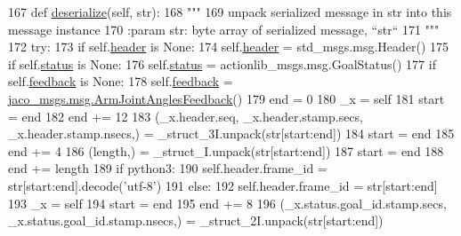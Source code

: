 \begin{DoxyCode}
167   \textcolor{keyword}{def }\hyperlink{classjaco__msgs_1_1msg_1_1__ArmJointAnglesActionFeedback_1_1ArmJointAnglesActionFeedback_afc2ada714b8f020c3588b9e5ad89b929}{deserialize}(self, str):
168     \textcolor{stringliteral}{"""}
169 \textcolor{stringliteral}{    unpack serialized message in str into this message instance}
170 \textcolor{stringliteral}{    :param str: byte array of serialized message, ``str``}
171 \textcolor{stringliteral}{    """}
172     \textcolor{keywordflow}{try}:
173       \textcolor{keywordflow}{if} self.\hyperlink{classjaco__msgs_1_1msg_1_1__ArmJointAnglesActionFeedback_1_1ArmJointAnglesActionFeedback_a7b1ea60184ef4d13c068de04538e8b50}{header} \textcolor{keywordflow}{is} \textcolor{keywordtype}{None}:
174         self.\hyperlink{classjaco__msgs_1_1msg_1_1__ArmJointAnglesActionFeedback_1_1ArmJointAnglesActionFeedback_a7b1ea60184ef4d13c068de04538e8b50}{header} = std\_msgs.msg.Header()
175       \textcolor{keywordflow}{if} self.\hyperlink{classjaco__msgs_1_1msg_1_1__ArmJointAnglesActionFeedback_1_1ArmJointAnglesActionFeedback_a8f64e8403349abcd0a905118e41ba76d}{status} \textcolor{keywordflow}{is} \textcolor{keywordtype}{None}:
176         self.\hyperlink{classjaco__msgs_1_1msg_1_1__ArmJointAnglesActionFeedback_1_1ArmJointAnglesActionFeedback_a8f64e8403349abcd0a905118e41ba76d}{status} = actionlib\_msgs.msg.GoalStatus()
177       \textcolor{keywordflow}{if} self.\hyperlink{classjaco__msgs_1_1msg_1_1__ArmJointAnglesActionFeedback_1_1ArmJointAnglesActionFeedback_ab40b90e61418b57e980514d739c2e72f}{feedback} \textcolor{keywordflow}{is} \textcolor{keywordtype}{None}:
178         self.\hyperlink{classjaco__msgs_1_1msg_1_1__ArmJointAnglesActionFeedback_1_1ArmJointAnglesActionFeedback_ab40b90e61418b57e980514d739c2e72f}{feedback} = \hyperlink{classjaco__msgs_1_1msg_1_1__ArmJointAnglesFeedback_1_1ArmJointAnglesFeedback}{jaco\_msgs.msg.ArmJointAnglesFeedback}()
179       end = 0
180       \_x = self
181       start = end
182       end += 12
183       (\_x.header.seq, \_x.header.stamp.secs, \_x.header.stamp.nsecs,) = \_struct\_3I.unpack(str[start:end])
184       start = end
185       end += 4
186       (length,) = \_struct\_I.unpack(str[start:end])
187       start = end
188       end += length
189       \textcolor{keywordflow}{if} python3:
190         self.header.frame\_id = str[start:end].decode(\textcolor{stringliteral}{'utf-8'})
191       \textcolor{keywordflow}{else}:
192         self.header.frame\_id = str[start:end]
193       \_x = self
194       start = end
195       end += 8
196       (\_x.status.goal\_id.stamp.secs, \_x.status.goal\_id.stamp.nsecs,) = \_struct\_2I.unpack(str[start:end])

\end{DoxyCode}
